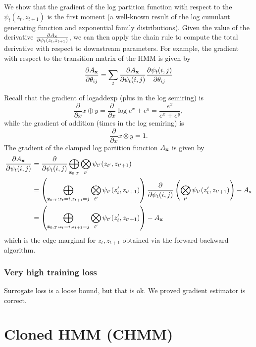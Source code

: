 \documentclass[12pt]{article}
\begin{document}
We show that the gradient of the log partition function with respect to the $\psi_t(z_t, z_{t+1})$
is the first moment (a well-known result of the log cumulant generating function
and exponential family distributions). Given the value of the derivative
$\frac{\partial A_{\mathbf{x}}}{\partial \psi_t(z_t, z_{t+1})}$,
we can then apply the chain rule to compute the total derivative with respect to
downstream parameters. For example, the gradient with respect to the transition matrix
of the HMM is given by
$$\frac{\partial A_{\mathbf{x}}}{\partial \theta_{ij}}
= \sum_t \frac{\partial A_{\mathbf{x}}}{\partial \psi_t(i,j)}
\frac{\partial \psi_t(i,j)}{\partial \theta_{ij}}$$

Recall that the gradient of logaddexp (plus in the log semiring) is
$$\frac{\partial}{\partial x} x \oplus y
= \frac{\partial}{\partial x} \log e^x + e^ y = \frac{e^x}{e^x + e^y},$$
while the gradient of addition (times in the log semiring) is
$$\frac{\partial}{\partial x} x \otimes y = 1.$$
The gradient of the clamped log partition function $A_{\mathbf{x}}$ is given by
\begin{align*}
\frac{\partial A_{\mathbf{x}}}{\partial \psi_t(i,j)}
&= \frac{\partial}{\partial \psi_t(i,j)} \bigoplus_{\mathbf{z}_{0:T}}
    \bigotimes_{t'} \psi_{t'}(z_{t'}, z_{t'+1})\\
&= \left(\bigoplus_{\mathbf{z}_{0:T}:z_t = i, z_{t+1} = j} 
    \bigotimes_{t'} \psi_{t'}(z_{t}', z_{t'+1})\right)
    \frac{\partial}{\partial \psi_t(i,j)}\left(\bigotimes_{t'} \psi_{t'}(z_{t}', z_{t'+1})\right) - A_{\mathbf{x}}\\
&= \left(\bigoplus_{\mathbf{z}_{0:T}:z_t = i, z_{t+1} = j} 
    \bigotimes_{t'} \psi_{t'}(z_{t}', z_{t'+1})\right)
    - A_{\mathbf{x}}
\end{align*} 
which is the edge marginal for $z_t, z_{t+1}$ obtained via the forward-backward algorithm.

\subsubsection{Very high training loss}
Surrogate loss is a loose bound, but that is ok.
We proved gradient estimator is correct.

\section{Cloned HMM (CHMM)}




%
%
\end{document}
